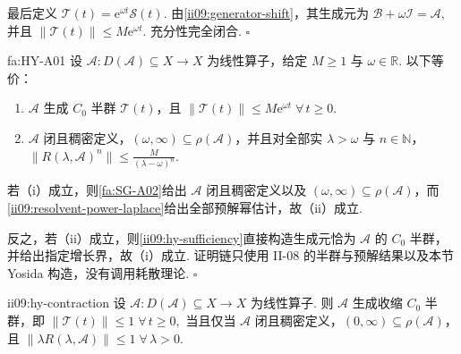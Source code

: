 \begin{FAProof}
最后定义 \(\displaystyle \mathcal T(t)=\mathrm{e}^{\omega t}\mathcal S(t).\)
由\autoref{ii09:generator-shift}，其生成元为 \(\displaystyle \mathcal B+\omega\mathcal I = \mathcal A,\)
并且 \(\displaystyle \|\mathcal T(t)\| \leqslant M\mathrm{e}^{\omega t}.\)
充分性完全闭合.
\hfill\(\square\)
\end{FAProof}

\begin{FATheorem}{fa:HY-A01}
设 \(\displaystyle \mathcal A:D(\mathcal A)\subseteq X\to X\)
为线性算子，给定 \(\displaystyle M\geqslant1\) 与 \(\displaystyle\omega\in\mathbb R\). 以下等价：
\begin{enumerate}[label=\textnormal{(\roman*)}]
\item \(\displaystyle\mathcal A\) 生成 \(\displaystyle C_0\) 半群 \(\displaystyle\mathcal T(t)\)，且 \(\displaystyle \|\mathcal T(t)\| \leqslant M\mathrm{e}^{\omega t} \; \forall\,t\geqslant0.\)
\item \(\displaystyle\mathcal A\) 闭且稠密定义，\(\displaystyle(\omega,\infty)\subseteq\rho(\mathcal A)\)，并且对全部实 \(\displaystyle\lambda>\omega\) 与 \(\displaystyle n\in\mathbb N\)， \(\displaystyle \|R(\lambda,\mathcal A)^n\| \leqslant \frac{M}{(\lambda-\omega)^n}.\)
\end{enumerate}
\end{FATheorem}

\begin{FAProof}
若（i）成立，则\autoref{fa:SG-A02}给出 \(\displaystyle\mathcal A\) 闭且稠密定义以及 \(\displaystyle(\omega,\infty)\subseteq\rho(\mathcal A)\)，而\autoref{ii09:resolvent-power-laplace}给出全部预解幂估计，故（ii）成立.

反之，若（ii）成立，则\autoref{ii09:hy-sufficiency}直接构造生成元恰为 \(\displaystyle\mathcal A\) 的 \(\displaystyle C_0\) 半群，并给出指定增长界，故（i）成立. 证明链只使用 II-08 的半群与预解结果以及本节 Yosida 构造，没有调用耗散理论.
\hfill\(\square\)
\end{FAProof}

\begin{FACorollary}{ii09:hy-contraction}
设 \(\displaystyle \mathcal A:D(\mathcal A)\subseteq X\to X\)
为线性算子. 则 \(\displaystyle\mathcal A\) 生成收缩 \(\displaystyle C_0\) 半群，即 \(\displaystyle \|\mathcal T(t)\|\leqslant1 \; \forall\,t\geqslant0,\)
当且仅当 \(\displaystyle\mathcal A\) 闭且稠密定义，\(\displaystyle(0,\infty)\subseteq\rho(\mathcal A)\)，且 \(\displaystyle \|\lambda R(\lambda,\mathcal A)\| \leqslant1 \; \forall\,\lambda>0.\)
\end{FACorollary}

